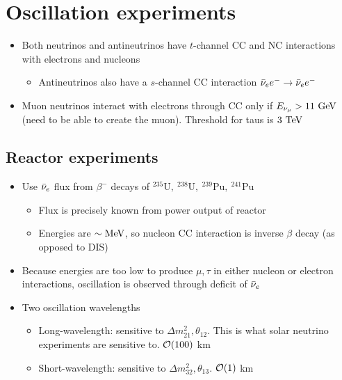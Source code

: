 \section{Oscillation experiments}
\begin{itemize}
  \item Both neutrinos and antineutrinos have $t$-channel CC and NC interactions with electrons and nucleons
  \begin{itemize}
    \item Antineutrinos also have a $s$-channel CC interaction ${\bar{\nu}}_e e^{-} \rightarrow {\bar{\nu}}_e e^{-}$
  \end{itemize}
  \item Muon neutrinos interact with electrons through CC only if $E_{\nu_\mu}>11~\text{GeV}$ (need to be able to create the muon). Threshold for taus is $3~\text{TeV}$
\end{itemize}

\subsection{Reactor experiments}
\begin{itemize}
  \item Use ${\bar{\nu}}_e$ flux from $\beta^-$ decays of $^{235}\text{U},~^{238}\text{U},~^{239}\text{Pu},~^{241}\text{Pu}$
  \begin{itemize}
    \item Flux is precisely known from power output of reactor
    \item Energies are $\sim\text{MeV}$, so nucleon CC interaction is inverse $\beta$ decay (as opposed to DIS)
  \end{itemize}
  \item Because energies are too low to produce $\mu,\tau$ in either nucleon or electron interactions, oscillation is observed through deficit of ${\bar{\nu}}_e$
  \item Two oscillation wavelengths
  \begin{itemize}
    \item Long-wavelength: sensitive to $\Delta m_{21}^2,\theta_{12}$. This is what solar neutrino experiments are sensitive to. $\mathcal{O}(100)$ km
    \item Short-wavelength: sensitive to $\Delta m_{32}^2,\theta_{13}$. $\mathcal{O}(1)$ km
  \end{itemize}
\end{itemize}

